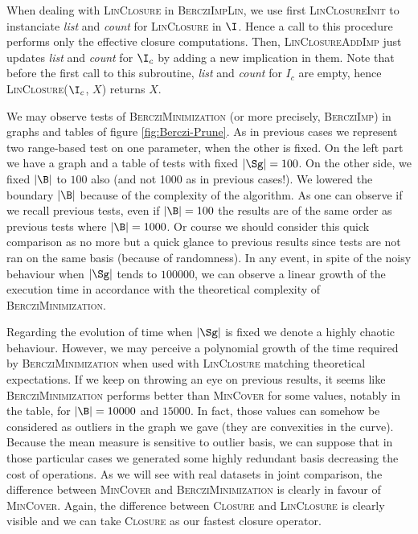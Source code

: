 When dealing with \textsc{LinClosure} in \textsc{BercziImpLin}, we use first \textsc{LinClosureInit} to instanciate 
\textit{list} and \textit{count} for \textsc{LinClosure} in $\I$. Hence a call
to this procedure performs only the effective closure computations. Then, 
\textsc{LinClosureAddImp} just updates \textit{list} and \textit{count} for $\I_c$ by adding a new implication in them. Note that before the first call to
this subroutine, \textit{list} and \textit{count} for $I_c$ are empty, hence
\textsc{LinClosure}($\I_c$, $X$) returns $X$.

\vspace{1.2em}

We may observe tests of \textsc{BercziMinimization} (or more precisely, \textsc{BercziImp}) in graphs and tables of figure \ref{fig:Berczi-Prune}. As in previous cases we represent two range-based test on one parameter, when the other is fixed. On the left part we have a graph and a table of tests with fixed $|\Sg| = 100$. On the other side, we fixed $|\B|$ to $100$ also (and not 1000 as in previous cases!). We lowered the boundary $|\B|$ because of the complexity of the algorithm. As one can observe if we recall previous tests, even if $|\B| = 100$ the results are of the same order as previous tests where $|\B| = 1000$. Or course we should consider this quick comparison as no more but a quick glance to previous results since tests are not ran on the same basis (because of randomness). In any event, in spite of the noisy behaviour when $|\Sg|$ tends to $100000$, we can observe a linear growth of the execution time in accordance with the theoretical complexity of \textsc{BercziMinimization}.


\begin{figure}[ht]
	
\end{figure}

\vspace{1.2em}

Regarding the evolution of time when $|\Sg|$ is fixed we denote a highly chaotic
behaviour. However, we may perceive a polynomial growth of the time required by
\textsc{BercziMinimization} when used with \textsc{LinClosure} matching theoretical expectations. If we keep on throwing an eye on previous results,
it seems like \textsc{BercziMinimization} performs better than \textsc{MinCover}
for some values, notably in the table, for $|\B| = 10000$ and $15000$. In fact,
those values can somehow be considered as outliers in the graph we gave (they are convexities in the curve). Because the mean measure is sensitive to outlier
basis, we can suppose that in those particular cases we generated some highly redundant basis decreasing the cost of operations. As we will see with real datasets in joint comparison, the difference between \textsc{MinCover} and \textsc{BercziMinimization} is clearly in favour of \textsc{MinCover}. Again, the difference between \textsc{Closure} and \textsc{LinClosure} is clearly visible and we can take \textsc{Closure} as our fastest closure operator.

